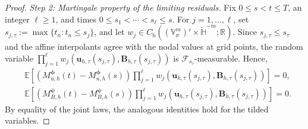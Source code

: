 \documentclass[11pt, reqno]{amsart}
\theoremstyle{definition}
\numberwithin{equation}{section}
\newcommand{\bff}{\boldsymbol}
\newcommand{\bb}{\mathbb}
\begin{document}
\begin{proof}
	\emph{Step 2: Martingale property of the limiting residuals.}
	Fix $0\le s<t\le T$, an integer $\ell\ge1$, and times
	$0\le s_1<\cdots<s_\ell\le s$.
	For $j=1,\ldots,\ell$, set $s_{j,\tau}:=\max\{t_n:t_n\le s_j\}$,
	and let $w_j\in C_{\mathrm b} \left((\bb V^m_\sigma)'\times\widetilde{\bb H}^{-m};\mathbb R\right)$.
	Since $s_{j,\tau}\le s_\tau$ and the affine interpolants agree with the
	nodal values at grid points, the random variable
	$\prod_{j=1}^{\ell}
	w_j\left(
	\bff u_{h,\tau}(s_{j,\tau}),
	\bff B_{h,\tau}(s_{j,\tau})
	\right)$
	is $\mathscr F_{s_\tau}$-measurable. Hence,
	\begin{align}
		\label{equ:discrete martingale test u}
		&\bb E\left[
		\left(
		M_{u,h}^{\bff\phi}(t)
		-
		M_{u,h}^{\bff\phi}(s)
		\right)
		\prod_{j=1}^{\ell}
		w_j\left(
		\bff u_{h,\tau}(s_{j,\tau}),
		\bff B_{h,\tau}(s_{j,\tau})
		\right)
		\right]
		=0,
		\\
		\label{equ:discrete martingale test B}
		&\bb E\left[
		\left(
		M_{B,h}^{\bff\psi}(t)
		-
		M_{B,h}^{\bff\psi}(s)
		\right)
		\prod_{j=1}^{\ell}
		w_j\left(
		\bff u_{h,\tau}(s_{j,\tau}),
		\bff B_{h,\tau}(s_{j,\tau})
		\right)
		\right]
		=0.
	\end{align}
	By equality of the joint laws, the analogous identities hold for the
	tilded variables.
	

\end{proof}
\end{document}
